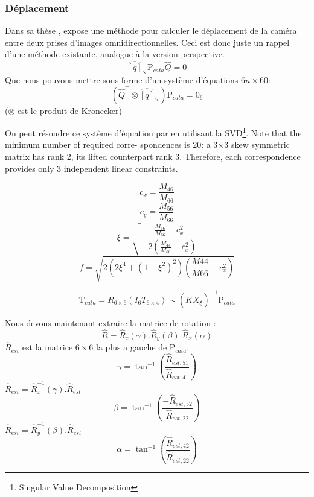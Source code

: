 \subsubsection{Déplacement}

Dans sa thèse \cite{Puig11PhD}, \citeauthor{Puig11PhD} expose une méthode pour calculer le déplacement de la caméra entre deux prises d'images omnidirectionnelles.
Ceci est donc juste un rappel d'une méthode existante, analogue à la version perspective.
\begin{equation}
\widehat{[q]}_\times \text{P}_{cata} \hat{Q} = 0
\end{equation}
Que nous pouvons mettre sous forme d'un système d'équations $6n\times60$:
\begin{equation}
\left( \hat{Q}^{\top} \otimes \widehat{[q]}_\times \right) \text{P}_{cata}  = 0_6
\end{equation}
($\otimes$ est le produit de Kronecker)

On peut résoudre ce système d'équation par  en utilisant la SVD\footnote{Singular Value Decomposition}.
Note that the minimum number of required corre-
spondences is 20: a 3$\times$3 skew symmetric matrix has rank 2, its lifted counterpart rank
3. Therefore, each correspondence provides only 3 independent linear constraints.

\begin{equation}
c_x = \frac{M_{46}}{M_{66}}
\end{equation}
\begin{equation}
c_y = \frac{M_{56}}{M_{66}}
\end{equation}
\begin{equation}
\xi = \sqrt{\frac{\frac{M_{16}}{M_{66}}-c_x^2}{-2\left( \frac{M_{44}}{M_{66}}-c_x^2 \right)}}
\end{equation}
\begin{equation}
f = \sqrt{2\left(2\xi^4 + \left(1-\xi^2\right)^2\right)\left(\frac{M44}{M66}-c_x^2\right)}
\end{equation}

\begin{equation}
\text{T}_{cata} = R_{6\times6} \left(I_6 T_{6\times4} \right) \sim (\hat{K}X_\xi )^{-1} \text{P}_{cata}
\end{equation}

Nous devons maintenant extraire la matrice de rotation :
\begin{equation}
\hat{R} = \hat{R}_z(\gamma).\hat{R}_y(\beta).\hat{R}_x(\alpha)
\end{equation}
$\hat{R}_{est}$ est la matrice $6\times6$ la plus a gauche de $\text{P}_{cata}$.
\begin{equation}
\gamma = \tan^{-1}\left(\frac{\hat{R}_{est,51}}{\hat{R}_{est,41}}\right)
\end{equation}
$\hat{R}_{est} = \hat{R}_z^{-1}(\gamma).\hat{R}_{est}$
\begin{equation}
\beta = \tan^{-1}\left(\frac{-\hat{R}_{est,52}}{\hat{R}_{est,22}}\right)
\end{equation}
$\hat{R}_{est} = \hat{R}_y^{-1}(\beta).\hat{R}_{est}$
\begin{equation}
\alpha = \tan^{-1}\left(\frac{\hat{R}_{est,42}}{\hat{R}_{est,22}}\right)
\end{equation}

